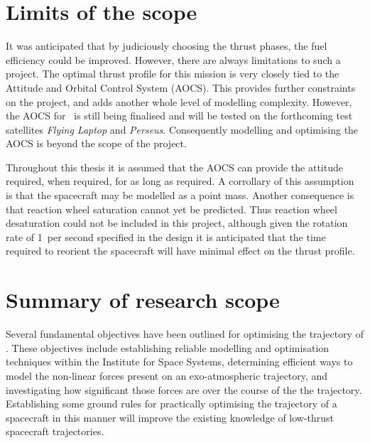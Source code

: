 \section{Limits of the scope}

It was anticipated that by judiciously choosing the thrust phases, the fuel efficiency could be improved. However, there are always limitations to such a project. The optimal thrust profile for this mission is very closely tied to the Attitude and Orbital Control System (AOCS). This provides further constraints on the project, and adds another whole level of modelling complexity. However, the AOCS for \BW\ is still being finalised and will be tested on the forthcoming test satellites \emph{Flying Laptop} and \emph{Perseus}. Consequently modelling and optimising the AOCS is beyond the scope of the project. 

Throughout this thesis it is assumed that the AOCS can provide the attitude required, when required, for as long as required. A corrollary of this assumption is that the spacecraft may be modelled as a point mass. Another consequence is that reaction wheel saturation cannot yet be predicted. Thus reaction wheel desaturation could not be included in this project, although given the rotation rate of 1\degrees\ per second specified in the design it is anticipated that the time required to reorient the spacecraft will have minimal effect on the thrust profile.

\section{Summary of research scope} \label{sec:Objective-summary}

Several fundamental objectives have been outlined for optimising the trajectory of \BW. These objectives include establishing reliable modelling and optimisation techniques within the Institute for Space Systems, determining efficient ways to model the non-linear forces present on an exo-atmospheric trajectory, and investigating how significant those forces are over the course of the the trajectory. Establishing some ground rules for practically optimising the trajectory of a spacecraft in this manner will improve the existing knowledge of low-thrust spacecraft trajectories.